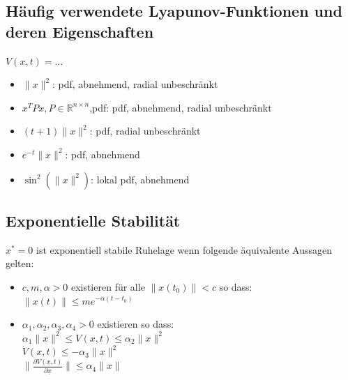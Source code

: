 \documentclass[german]{latex4ei/latex4ei_sheet}
\begin{document}
\begin{sectionbox}
\subsection{Häufig verwendete Lyapunov-Funktionen und deren Eigenschaften}
$V(x,t) = \dots$
\begin{itemize}
  \item $\|x\|^2$: pdf, abnehmend, radial unbeschränkt
  \item $x^T P x, P \in \mathbb{R}^{n \times n}$,pdf: pdf, abnehmend, radial unbeschränkt
  \item $(t+1) \|x\|^2$: pdf, radial unbeschränkt
  \item $e^{-t}\|x\|^2$: pdf, abnehmend
  \item $\sin^2(\|x\|^2)$: lokal pdf, abnehmend
\end{itemize}

\subsection{Exponentielle Stabilität}
$x^* = 0$ ist exponentiell stabile Ruhelage wenn folgende äquivalente Aussagen gelten:
\begin{itemize}
  \item $c,m,\alpha > 0 $ existieren für alle $\|x(t_0)\| < c$ so dass: $\|x(t)\| \leq me^{-\alpha(t-t_0)}$
  \item $\alpha_1, \alpha_2, \alpha_3, \alpha_4 > 0$ existieren so dass:\\
    $\alpha_1 \|x\|^2 \leq V(x,t) \leq \alpha_2 \|x\|^2$ \\
    $\dot{V}(x,t) \leq - \alpha_3 \|x\|^2$ \\
    $\|\frac{\partial V(\underline{x},t)}{\partial \underline{x}}\| \leq \alpha_4 \|x\| $
\end{itemize}
\end{sectionbox}
\end{document}

